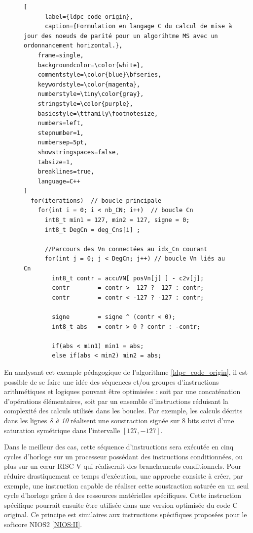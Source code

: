 \documentclass[../main.tex]{subfiles}
\begin{document}
\begin{figure}[!tb]
\begin{lstlisting}[
      label={ldpc_code_origin},
      caption={Formulation en langage C du calcul de mise à jour des noeuds de parité pour un algorihtme MS avec un ordonnancement horizontal.},
    frame=single,
    backgroundcolor=\color{white},  
    commentstyle=\color{blue}\bfseries,
    keywordstyle=\color{magenta},
    numberstyle=\tiny\color{gray},
    stringstyle=\color{purple},
    basicstyle=\ttfamily\footnotesize,
    numbers=left,
    stepnumber=1,
    numbersep=5pt,                 
    showstringspaces=false,
    tabsize=1,
    breaklines=true,
    language=C++
]
  for(iterations)  // boucle principale
    for(int i = 0; i < nb_CN; i++)  // boucle Cn
      int8_t min1 = 127, min2 = 127, signe = 0;
      int8_t DegCn = deg_Cns[i] ;
      
      //Parcours des Vn connectées au idx_Cn courant 
      for(int j = 0; j < DegCn; j++) // boucle Vn liés au Cn 
        int8_t contr = accuVN[ posVn[j] ] - c2v[j]; 
        contr        = contr >  127 ?  127 : contr;
        contr        = contr < -127 ? -127 : contr;
        
        signe        = signe ^ (contr < 0);
        int8_t abs   = contr > 0 ? contr : -contr;
      
        if(abs < min1) min1 = abs;
        else if(abs < min2) min2 = abs;
\end{lstlisting}
\end{figure}


En analysant cet exemple pédagogique de l'algorithme \ref{ldpc_code_origin}, il est possible de se faire une idée des séquences et/ou groupes d'instructions arithmétiques et logiques pouvant être optimisées : soit par une concaténation d'opérations élémentaires, soit par un ensemble d'instructions réduisant la complexité des calculs utilisés dans les boucles. 
Par exemple, les calculs décrits dans les lignes \textit{8 à 10} réalisent une soustraction signée sur 8 bits suivi d'une saturation symétrique dans l'intervalle $[127, -127]$.

Dans le meilleur des cas, cette séquence d'instructions sera exécutée en cinq cycles d'horloge sur un processeur possédant des instructions conditionnées, ou plus sur un cœur RISC-V qui réaliserait des branchements conditionnels. Pour réduire drastiquement ce temps d'exécution, une approche consiste à créer, par exemple, une instruction capable de réaliser cette soustraction saturée en un seul cycle d'horloge grâce à des ressources matérielles spécifiques. Cette instruction spécifique pourrait ensuite être utilisée dans une version optimisée du code C original. Ce principe est similaires aux instructions spécifiques proposées pour le softcore NIOS2 \ref{NIOS:II}.
\end{document}
